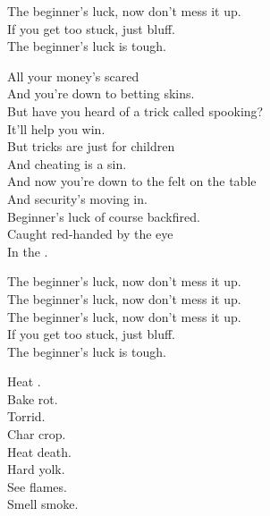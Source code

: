 
The beginner's luck, now don't mess it up. \\
If you get too stuck, just bluff. \\
The beginner's luck is tough. \\


All your money's scared \\
And you're down to betting skins. \\
But have you heard of a trick called spooking? \\
It'll help you win. \\

But tricks are just for children \\
And cheating is a sin. \\
And now you're down to the felt on the table \\
And security's moving in. \\

Beginner's luck of course backfired. \\
Caught red-handed by the eye \\
In the . \\


The beginner's luck, now don't mess it up. \\
The beginner's luck, now don't mess it up. \\
The beginner's luck, now don't mess it up. \\
If you get too stuck, just bluff. \\
The beginner's luck is tough. \\





Heat . \\
Bake rot. \\
Torrid. \\
Char crop. \\
Heat death. \\
Hard yolk. \\
See flames. \\
Smell smoke. \\

